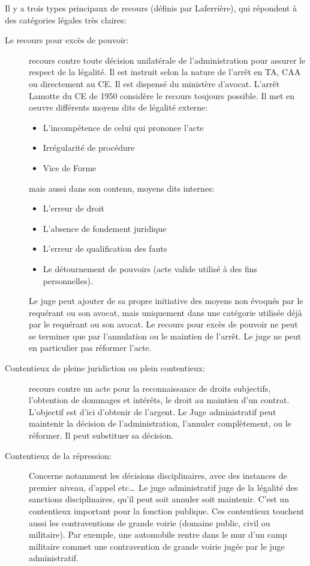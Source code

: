 \documentclass[math]{cours}
\begin{document}
Il y a trois types principaux de recours (définis par Laferrière), qui répondent à des catégories légales très claires:
\begin{description}
	\item[Le recours pour excès de pouvoir:]
		recours contre toute décision unilatérale de l'administration pour assurer le respect de la légalité.
		Il est instruit selon la nature de l'arrêt en TA, CAA ou directement au CE.
		Il est dispensé du ministère d'avocat.
		L'arrêt Lamotte du CE de 1950 considère le recours toujours possible.
		Il met en oeuvre différents moyens dits de légalité externe:
		\begin{itemize}
			\item L'incompétence de celui qui prononce l'acte
			\item Irrégularité de procédure
			\item Vice de Forme
		\end{itemize}
		mais aussi dans son contenu, moyens dits internes:
		\begin{itemize}
			\item L'erreur de droit
			\item L'absence de fondement juridique
			\item L'erreur de qualification des fauts
			\item Le détournement de pouvoirs (acte valide utilisé à des fins personnelles).
		\end{itemize}
		Le juge peut ajouter de sa propre initiative des moyens non évoqués par le requérant ou son avocat, mais uniquement dans une catégorie utilisée déjà par le requérant ou son avocat.
		Le recours pour excès de pouvoir ne peut se terminer que par l'annulation ou le maintien de l'arrêt.
		Le juge ne peut en particulier pas réformer l'acte.
	\item[Contentieux de pleine juridiction ou plein contentieux:]
		recours contre un acte pour la reconnaissance de droits subjectifs, l'obtention de dommages et intérêts,
		le droit au maintien d'un contrat.
		L'objectif est d'ici d'obtenir de l'argent.
		Le Juge administratif peut maintenir la décision de l'administration, l'annuler complètement, ou le réformer.
		Il peut substituer sa décision.
	\item[Contentieux de la répression:]
		Concerne notamment les décisions disciplinaires, avec des instances de premier niveau, d'appel etc\ldots\
		Le juge administratif juge de la légalité des sanctions disciplinaires, qu'il peut soit annuler soit maintenir.
		C'est un contentieux important pour la fonction publique.
		Ces contentieux touchent aussi les contraventions de grande voirie (domaine public, civil ou militaire).
		Par exemple, une automobile rentre dans le mur d'un camp militaire commet une contravention de grande voirie jugée par le juge administratif.
\end{description}
\end{document}
